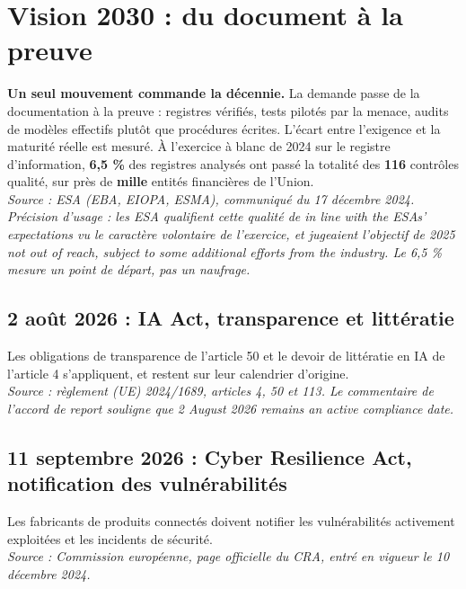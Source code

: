 \documentclass[11pt,a4paper]{article}
\newcommand{\src}[1]{{\footnotesize\itshape\textcolor{bleu}{Source : #1}}}
\begin{document}
\section{Vision 2030 : du document à la preuve}

\noindent \textbf{Un seul mouvement commande la décennie.} La demande passe de la documentation
à la preuve : registres vérifiés, tests pilotés par la menace, audits de modèles effectifs
plutôt que procédures écrites. L'écart entre l'exigence et la maturité réelle est mesuré. À
l'exercice à blanc de 2024 sur le registre d'information, \textbf{6,5 \%} des registres
analysés ont passé la totalité des \textbf{116} contrôles qualité, sur près de \textbf{mille}
entités financières de l'Union. \\
\src{ESA (EBA, EIOPA, ESMA), communiqué du 17 décembre 2024. Précision d'usage : les ESA
qualifient cette qualité de \og{}in line with the ESAs' expectations\fg{} vu le caractère
volontaire de l'exercice, et jugeaient l'objectif de 2025 \og{}not out of reach, subject to some
additional efforts from the industry\fg{}. Le 6,5 \% mesure un point de départ, pas un naufrage.}

\subsection{2 août 2026 : IA Act, transparence et littératie}
Les obligations de transparence de l'article 50 et le devoir de littératie en IA de l'article 4
s'appliquent, et restent sur leur calendrier d'origine. \\
\src{règlement (UE) 2024/1689, articles 4, 50 et 113. Le commentaire de l'accord de report
souligne que \og{}2 August 2026 remains an active compliance date\fg{}.}

\subsection{11 septembre 2026 : Cyber Resilience Act, notification des vulnérabilités}
Les fabricants de produits connectés doivent notifier les vulnérabilités activement exploitées
et les incidents de sécurité. \\
\src{Commission européenne, page officielle du CRA, entré en vigueur le 10 décembre 2024.}
\end{document}
